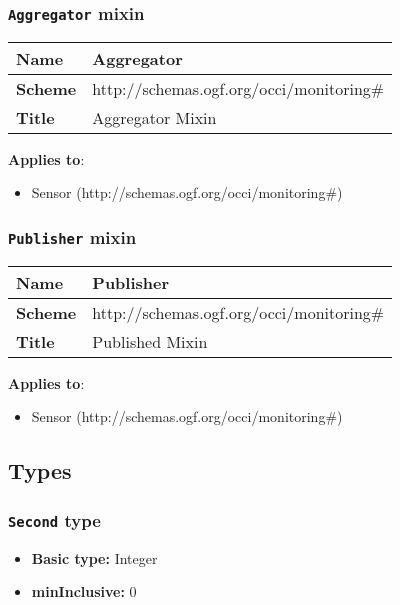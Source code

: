 \subsubsection{\texttt{Aggregator} mixin}
\begin{center}
\begin{tabular}{|l|l|}
  \hline
  \textbf{Name} & Aggregator \\
  \hline  
  \textbf{Scheme} & http://schemas.ogf.org/occi/monitoring\# \\
  \hline
  \textbf{Title} & Aggregator Mixin \\
  \hline
\end{tabular}
\end{center}
\textbf{Applies to}:
\begin{itemize}
	\item Sensor (http://schemas.ogf.org/occi/monitoring\#)
\end{itemize}



\subsubsection{\texttt{Publisher} mixin}
\begin{center}
\begin{tabular}{|l|l|}
  \hline
  \textbf{Name} & Publisher \\
  \hline  
  \textbf{Scheme} & http://schemas.ogf.org/occi/monitoring\# \\
  \hline
  \textbf{Title} & Published Mixin \\
  \hline
\end{tabular}
\end{center}
\textbf{Applies to}:
\begin{itemize}
	\item Sensor (http://schemas.ogf.org/occi/monitoring\#)
\end{itemize}



\subsection{Types}
\subsubsection{\texttt{Second} type}

\begin{itemize}
\item \textbf{Basic type:} Integer
	\item \textbf{minInclusive:} 0
\end{itemize}
